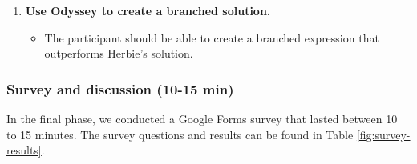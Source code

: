 \begin{enumerate}
    \item \textbf{Use Odyssey to create a branched solution.}
        \begin{itemize}
        \item The participant should be able to create a branched expression that outperforms Herbie’s solution.
        \end{itemize}
    \end{enumerate}

\subsubsection{Survey and discussion (10-15 min)}
In the final phase, 
  we conducted a Google Forms survey that lasted between 10 to 15 minutes.
  The survey questions and results can be found in Table \ref{fig:survey-results}.

  
